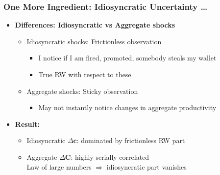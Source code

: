 \documentclass{beamer}\usepackage{dcolumn}
\newcommand{\jemph}[1]{{\color{StataDarkBlue}#1}}
\newcommand{\jbemph}[1]{\textbf{\color{SlideNavy}#1}}
\providecommand{\jemph}[1]{{\color{jirkasblue}#1}}
\begin{document}
\begin{frame}
\frametitle{One More Ingredient: Idiosyncratic Uncertainty \dots}

\begin{itemize}
\setlength{\itemsep}{3mm}
\item  \jbemph{Differences: Idiosyncratic vs Aggregate shocks}

\begin{itemize}
\setlength{\itemsep}{2mm}
\item  \jemph{Idiosyncratic shocks:} Frictionless observation
  \begin{itemize}
  \setlength{\itemsep}{1mm}
  \item I notice if I am fired, promoted, somebody steals my wallet
  \item  True RW with respect to these
  \end{itemize}
\item \jemph{Aggregate shocks:} Sticky observation
 \begin{itemize}
   \setlength{\itemsep}{1mm}
  \item May not instantly notice changes in aggregate productivity
  \end{itemize}
\end{itemize}

\item \jbemph{Result:}
\begin{itemize}
  \setlength{\itemsep}{1mm}
\item  \jemph{Idiosyncratic $\Delta \mathbf{c}$}: dominated by frictionless RW part
\item  \jemph{Aggregate     $\Delta \mathbf{C}$}: highly serially correlated\\
  Law of large numbers $\Rightarrow$ idiosyncratic part vanishes
\end{itemize}
\end{itemize}

\end{frame}
\end{document}
